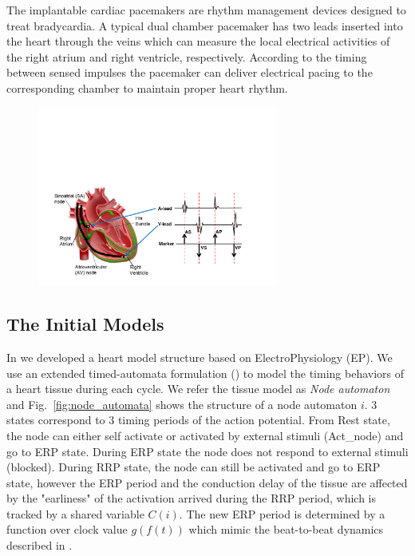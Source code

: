 \documentclass{llncs}
\newcommand{\figref}[1]{Fig.~\ref{fig:#1}}
\begin{document}
The implantable cardiac pacemakers are rhythm management devices designed to treat bradycardia. A typical dual chamber pacemaker has two leads inserted into the heart through the veins which can measure the local electrical activities of the right atrium and right ventricle, respectively. According to the timing between sensed impulses the pacemaker can deliver electrical pacing to the corresponding chamber to maintain proper heart rhythm.
\begin{figure}[!t]
\centering
		\includegraphics[width=0.7\textwidth]{figs/egm.pdf}
		
\caption{\small }
\label{fig:probes}
\end{figure} 
\subsection{The Initial Models}
In \cite{VHM_proc} we developed a heart model structure based on ElectroPhysiology (EP). We use an extended timed-automata formulation (\cite{timed_automata}) to model the timing behaviors of a heart tissue during each cycle. We refer the tissue model as \emph{Node automaton} and \figref{node_automata} shows the structure of a node automaton $i$. 3 states correspond to 3 timing periods of the action potential. From \textsf{Rest} state, the node can either self activate or activated by external stimuli (Act\_node) and go to \textsf{ERP} state. During \textsf{ERP} state the node does not respond to external stimuli (blocked). During \textsf{RRP} state, the node can still be activated and go to \textsf{ERP} state, however the ERP period and the conduction delay of the tissue are affected by the "earliness" of the activation arrived during the RRP period, which is tracked by a shared variable $C(i)$. The new ERP period is determined by a function over clock value $g(f(t))$ which mimic the beat-to-beat dynamics described in \cite{josephson}. 
\end{document}
